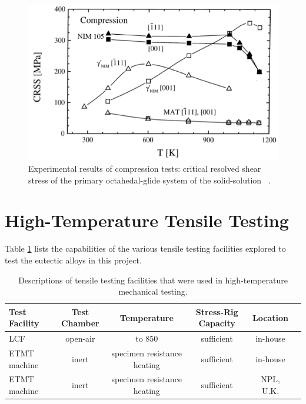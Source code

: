 \vspace{6mm}
\begin{figure}[H]
\begin{center}
\includegraphics[width=14cm]{anomalous}
\caption{Experimental results of compression tests: critical resolved shear stress of the primary octahedal-glide system of the solid-solution ~\cite{nembach00}.}
\label{fig:anomalous}
\end{center}
\end{figure} 



\section{High-Temperature Tensile Testing}

Table \ref{tab:tensile} lists the capabilities of the various tensile testing facilities explored to test the eutectic alloys in this project.

%
\begin{table}[htdp]
\begin{center}
\begin{tabular}{lccccc}
\hline\hline
Test Facility 		&  Test Chamber&Temperature&	Stress-Rig Capacity&	Location	\\
\hline
LCF				&open-air	&to 850\celsius				&sufficient	&in-house\\	
ETMT machine 	&inert		& specimen resistance heating	&sufficient	&in-house  \\
ETMT machine		&inert		&specimen resistance heating		&sufficient	&NPL, U.K.\\
\hline\hline
\end{tabular}
\end{center}
\caption{Descriptions of tensile testing facilities that were used in high-temperature mechanical testing.}
\label{tab:tensile}
\end{table}


